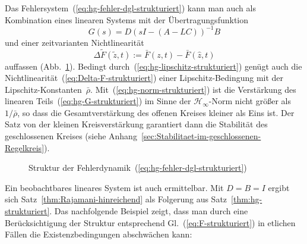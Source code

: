 Das Fehlersystem~(\ref{eq:hg-fehler-dgl-strukturiert}) kann man
auch als Kombination eines linearen Systems mit der Übertragungsfunktion
\begin{equation}
G(s)=D\left(sI-(A-LC)\right)^{-1}B\label{eq:hg-G-strukturiert}
\end{equation}
und einer zeitvarianten Nichtlinearität
\begin{equation}
\Delta\widetilde{F}(\tilde{z},t):=\bar{F}(z,t)-\bar{F}(\hat{z},t)\label{eq:Delta-F-strukturiert}
\end{equation}
auffassen (Abb.~\ref{fig:Strukturierte-Fehlerdynamik}). Bedingt
durch~(\ref{eq:hg-lipschitz-strukturiert}) genügt auch die Nichtlinearität~(\ref{eq:Delta-F-strukturiert})
einer Lipschitz-Bedingung mit der Lipschitz-Konstanten~$\bar{\rho}$.
Mit~(\ref{eq:hg-norm-strukturiert}) ist die Verstärkung des linearen
Teils~(\ref{eq:hg-G-strukturiert}) im Sinne der $\mathcal{H}_{\infty}$-Norm
nicht größer als $1/\bar{\rho}$, so dass die Gesamtverstärkung des
offenen Kreises kleiner als Eins ist. Der Satz von der kleinen Kreisverstärkung
garantiert dann die Stabilität des geschlossenen Kreises (siehe Anhang~\ref{sec:Stabilitaet-im-geschlossenen-Regelkreis}).

\begin{figure}
\begin{centering}
\resizebox{0.98\textwidth}{!}{}
\par\end{centering}
\caption{Struktur der Fehlerdynamik~(\ref{eq:hg-fehler-dgl-strukturiert})\label{fig:Strukturierte-Fehlerdynamik}}
\end{figure}

Ein beobachtbares lineares System ist auch ermittelbar. Mit $D=B=I$
ergibt sich Satz~\ref{thm:Rajamani-hinreichend} als Folgerung aus
Satz~\ref{thm:hg-strukturiert}. Das nachfolgende Beispiel zeigt,
dass man durch eine Berücksichtigung der Struktur entsprechend Gl.~(\ref{eq:F-strukturiert})
in etlichen Fällen die Existenzbedingungen abschwächen kann:

